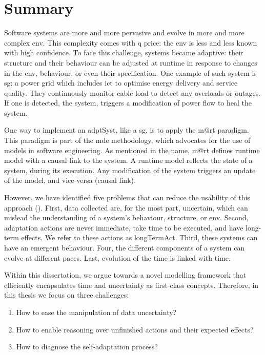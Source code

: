 \section{Summary}

Software systems are more and more pervasive and evolve in more and more complex \gls{env}.
This complexity comes with q price: the \gls{env} is less and less known with high confidence.
To face this challenge, systems became adaptive: their \gls{structure} and their \gls{behaviour} can be adjusted at runtime in response to changes in the \gls{env}, \gls{behaviour}, or even their specification.
One example of such system is \gls{sg}: a power grid which includes \gls{ict} to optimise energy delivery and service quality.
They continuously monitor cable load to detect any overloads or outages.
If one is detected, the system, triggers a modification of power flow to heal the system.

One way to implement an \gls{adptSyst}, like a \gls{sg}, is to apply the \gls{m@rt} paradigm.
This paradigm is part of the \gls{mde} methodology, which advocates for the use of \glspl{model} in software engineering.
As mentioned in the name, \gls{m@rt} defines runtime \gls{model} with a causal link to the system.
A runtime \gls{model} reflects the state of a system, during its execution.
Any modification of the system triggers an update of the \gls{model}, and vice-versa (causal link).

However, we have identified five problems that can reduce the usability of this approach (\cf {}).
First, data collected are, for the most part, uncertain, which can mislead the understanding of a system's \gls{behaviour}, \gls{structure}, or \gls{env}.
Second, adaptation \glspl{action} are never immediate, take time to be executed, and have long-term effects.
We refer to these \glspl{action} as \gls{longTermAct}.
Third, these systems can have an emergent \gls{behaviour}.
Four, the different components of a system can evolve at different paces.
Last, evolution of the time is linked with time.

Within this dissertation, we argue towards a novel modelling framework that efficiently encapsulates time and uncertainty as first-class concepts.
 Therefore, in this thesis we focus on three challenges:
\begin{enumerate}
	\vspace{-0.5em}
	\setlength\itemsep{-0.3em}
	\item How to ease the manipulation of data uncertainty?
	\item How to enable reasoning over unfinished actions and their expected effects?
	\item How to diagnose the self-adaptation process?
\end{enumerate}

